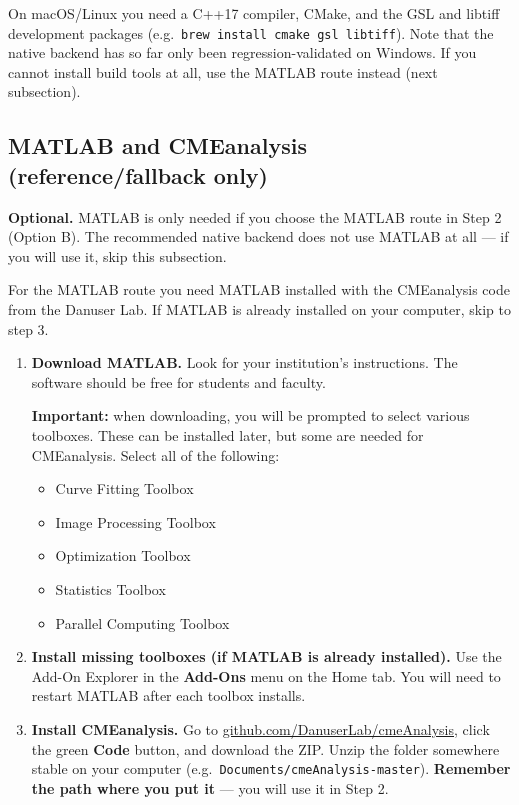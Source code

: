 \documentclass[11pt]{article}
\newcommand{\code}[1]{\texttt{#1}}
\begin{document}
On macOS/Linux you need a C++17 compiler, CMake, and the GSL and
libtiff development packages (e.g.\ \code{brew install cmake gsl
libtiff}). Note that the native backend has so far only been
regression-validated on Windows. If you cannot install build tools at
all, use the MATLAB route instead (next subsection).

\subsection{MATLAB and CMEanalysis (reference/fallback only)}

\begin{notebox}
\textbf{Optional.} MATLAB is only needed if you choose the MATLAB
route in Step 2 (Option B). The recommended native backend does not
use MATLAB at all --- if you will use it, skip this subsection.
\end{notebox}

For the MATLAB route you need MATLAB installed with the CMEanalysis
code from the Danuser Lab. If MATLAB is already installed on your
computer, skip to step 3.

\begin{enumerate}[leftmargin=*]
    \item \textbf{Download MATLAB.} Look for your institution's
    instructions. The software should be free for students and
    faculty.

    \textbf{Important:} when downloading, you will be prompted to
    select various toolboxes. These can be installed later, but some
    are needed for CMEanalysis. Select all of the following:

    \begin{itemize}
        \item Curve Fitting Toolbox
        \item Image Processing Toolbox
        \item Optimization Toolbox
        \item Statistics Toolbox
        \item Parallel Computing Toolbox
    \end{itemize}

    \item \textbf{Install missing toolboxes (if MATLAB is already
    installed).} Use the Add-On Explorer in the \textbf{Add-Ons} menu
    on the Home tab. You will need to restart MATLAB after each
    toolbox installs.

    \item \textbf{Install CMEanalysis.} Go to
    \href{https://github.com/DanuserLab/cmeAnalysis}{github.com/DanuserLab/cmeAnalysis},
    click the green \textbf{Code} button, and download the ZIP. Unzip
    the folder somewhere stable on your computer (e.g.\
    \code{Documents/cmeAnalysis-master}). \textbf{Remember the path
    where you put it} --- you will use it in Step 2.
\end{enumerate}
\end{document}
